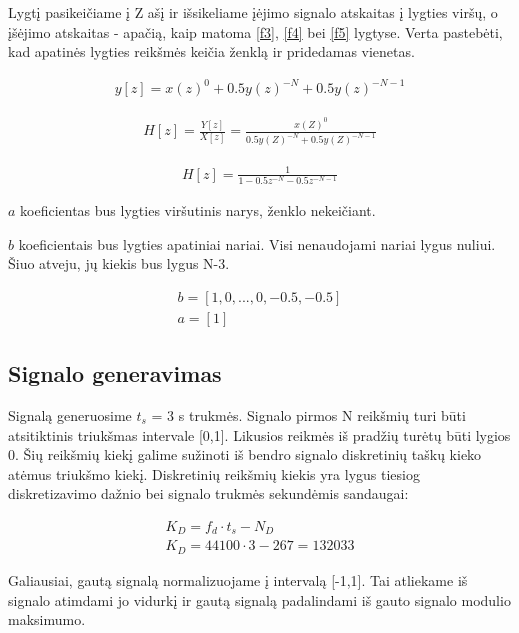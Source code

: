 \documentclass[10pt,a4paper,twocolumn]{article}
\begin{document}
Lygtį pasikeičiame į Z ašį ir išsikeliame įėjimo signalo atskaitas į lygties viršų, o įšėjimo atskaitas - apačią, kaip matoma \ref{f3}, \ref{f4} bei \ref{f5} lygtyse. Verta pastebėti, kad apatinės lygties reikšmės keičia ženklą ir pridedamas vienetas.

\begin{eqnarray}
y[z] = x(z)^0 + 0.5y(z)^{-N} + 0.5y(z)^{-N-1}
\label{f3}
\end{eqnarray}



\begin{eqnarray}
H[z] = \frac{Y[z]}{X[z]} = \frac{x(Z)^0}{0.5y(Z)^{-N} + 0.5y(Z)^{-N-1}}
\label{f4}
\end{eqnarray}

\begin{eqnarray}
H[z] = \frac{1}{1 -0.5z^{-N} -0.5z^{-N-1}}
\label{f5}
\end{eqnarray}


$a$ koeficientas bus lygties viršutinis narys, ženklo nekeičiant.

$b$ koeficientais bus lygties apatiniai nariai. Visi nenaudojami nariai lygus nuliui. Šiuo atveju, jų kiekis bus lygus N-3.

\begin{eqnarray}
b = [1,0,...,0,-0.5,-0.5] \\
a = [1]
\end{eqnarray}


\subsection*{Signalo generavimas}

Signalą generuosime $t_s$ = 3 s trukmės. Signalo pirmos N reikšmių turi būti atsitiktinis triukšmas intervale [0,1]. Likusios reikmės iš pradžių turėtų būti lygios 0. Šių reikšmių kiekį galime sužinoti iš bendro signalo diskretinių taškų kieko atėmus triukšmo kiekį. Diskretinių reikšmių kiekis yra lygus tiesiog diskretizavimo dažnio bei signalo trukmės sekundėmis sandaugai:


\begin{eqnarray}
K_D = f_d \cdot t_s - N_D \\
K_D = 44100 \cdot 3 - 267 = 132033
\end{eqnarray}


Galiausiai, gautą signalą normalizuojame į intervalą [-1,1]. Tai atliekame iš signalo atimdami jo vidurkį ir gautą signalą padalindami iš gauto signalo modulio maksimumo.
\end{document}

